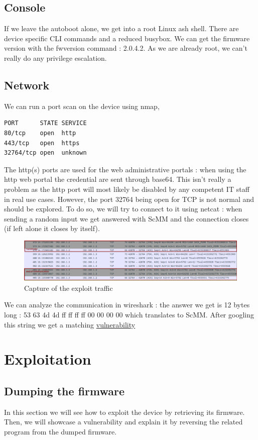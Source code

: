 \documentclass{article}
\begin{document}
\subsection{Console}
If we leave the autoboot alone, we get into a root Linux ash shell. There are device specific CLI commands and a reduced busybox. We can get the firmware version with the fwversion command : 2.0.4.2. As we are already root, we can't really do any privilege escalation.
\subsection{Network}\label{netreco}
We can run a port scan on the device using nmap, 

\begin{lstlisting}
PORT      STATE SERVICE  
80/tcp    open  http  
443/tcp   open  https  
32764/tcp open  unknown  
\end{lstlisting}

The http(s) ports are used for the web administrative portals : when using the http web portal the credential are sent through base64. This isn't really a problem as the http port will most likely be disabled by any competent IT staff in real use cases. However, the port 32764 being open for TCP is not normal and should be explored. To do so, we will try to connect to it using netcat : when sending a random input we get answered with ScMM and the connection closes (if left alone it closes by itself).
\begin{figure}[!ht]
	\centering
	\includegraphics[width=\textwidth]{example.png}
	\caption{Capture of the exploit traffic}
\end{figure}

\noindent We can analyze the communication in wireshark : the answer we get is 12 bytes long : 53 63 4d 4d ff ff ff ff 00 00 00 00 which translates to ScMM. After googling this string we get a matching \href{https://github.com/elvanderb/TCP-32764}{vulnerability}	
\section{Exploitation}

\subsection{Dumping the firmware}
In this section we will see how to exploit the device by retrieving its firmware. Then, we will showcase a vulnerability and explain it by reversing the related program from the dumped firmware.
\end{document}
